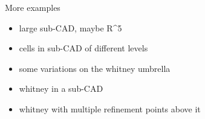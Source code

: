 \documentclass[
]{book}
\theoremstyle{definition}
\theoremstyle{definition}
\theoremstyle{definition}
\theoremstyle{definition}
\theoremstyle{remark}
\begin{document}
More examples

\begin{itemize}
\item
  large sub-CAD, maybe R\^{}5
\item
  cells in sub-CAD of different levels
\item
  some variations on the whitney umbrella
\item
  whitney in a sub-CAD
\item
  whitney with multiple refinement points above it
\end{itemize}

  
\end{document}
